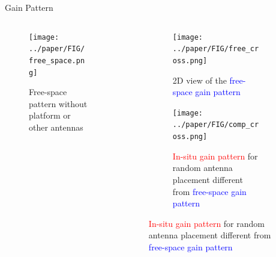 \documentclass{beamer}
\begin{document}
\begin{frame}{Gain Pattern}
    \begin{columns}
        \begin{column}{0.5\linewidth}
            \begin{figure}
                \vspace{-2.5cm}
                \centering
                \texttt{[image: ../paper/FIG/free\_space.png]}
                \caption*{\tiny Free-space pattern without platform or other antennas}
            \end{figure}
        \end{column}
        \begin{column}{0.5\linewidth}
            \begin{overlayarea}{\textwidth}{\textheight}
                \begin{figure}
                    \begin{subfigure}{\columnwidth}
                        \centering
                        \texttt{[image: ../paper/FIG/free\_cross.png]}
                        \caption*{\tiny {2D view of the \textcolor{blue}{free-space gain pattern}}}%
                    \end{subfigure}\vspace*{2mm}
                    \begin{subfigure}{\columnwidth}
                        \centering
                        \texttt{[image: ../paper/FIG/comp\_cross.png]}
                        \caption*{\tiny {\textcolor{red}{In-situ gain pattern} for random antenna placement different from \textcolor{blue}{free-space gain pattern}}}%
                    \end{subfigure}
                \end{figure}
            \end{overlayarea}
        \end{column}
    \end{columns}
\end{frame}
\end{document}
